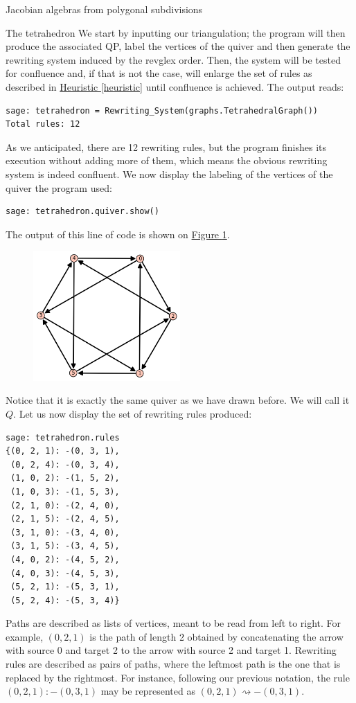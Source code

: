 \begin{chapter}{Jacobian algebras from polygonal subdivisions}
\begin{section}{The tetrahedron}
We start by inputting our triangulation; the program will then produce the associated QP, label the vertices of the quiver and then generate the rewriting system induced by the revglex order. Then, the system will be tested for confluence and, if that is not the case, will enlarge the set of rules as described in \hyperref[heuristic]{Heuristic \ref*{heuristic}} until confluence is achieved. The output reads:
\begin{lstlisting}
sage: tetrahedron = Rewriting_System(graphs.TetrahedralGraph())
Total rules: 12
\end{lstlisting}
As we anticipated, there are 12 rewriting rules, but the program finishes its execution without adding more of them, which means the obvious rewriting system is indeed confluent. We now display the labeling of the vertices of the quiver the program used:
\begin{lstlisting}
sage: tetrahedron.quiver.show()
\end{lstlisting}
The output of this line of code is shown on \hyperref[quiverfigure]{Figure \ref*{quiverfigure}}.
\begin{figure}[h] \label{quiverfigure}
\centering
\includegraphics[width=0.5\textwidth]{tetra_quiver.png}
\caption{}
\end{figure}
Notice that it is exactly the same quiver as we have drawn before. We will call it $Q$. Let us now display the set of rewriting rules produced:
\begin{lstlisting}
sage: tetrahedron.rules
{(0, 2, 1): -(0, 3, 1),
 (0, 2, 4): -(0, 3, 4),
 (1, 0, 2): -(1, 5, 2),
 (1, 0, 3): -(1, 5, 3),
 (2, 1, 0): -(2, 4, 0),
 (2, 1, 5): -(2, 4, 5),
 (3, 1, 0): -(3, 4, 0),
 (3, 1, 5): -(3, 4, 5),
 (4, 0, 2): -(4, 5, 2),
 (4, 0, 3): -(4, 5, 3),
 (5, 2, 1): -(5, 3, 1),
 (5, 2, 4): -(5, 3, 4)}
\end{lstlisting}
Paths are described as lists of vertices, meant to be read from left to right. For example, $(0,2,1)$ is the path of length 2 obtained by concatenating the arrow with source 0 and target 2 to the arrow with source 2 and target 1. Rewriting rules are described as pairs of paths, where the leftmost path is the one that is replaced by the rightmost. For instance, following our previous notation, the rule $(0, 2, 1): -(0, 3, 1)$ may be represented as $(0,2,1) \rightsquigarrow -(0,3,1)$.


\end{section}
\end{chapter}

